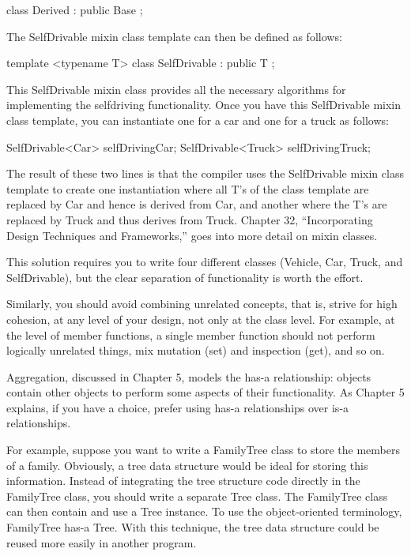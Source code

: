 \begin{cpp}
class Derived : public Base {};
\end{cpp}

The SelfDrivable mixin class template can then be defined as follows:

\begin{cpp}
template <typename T>
class SelfDrivable : public T
{
};
\end{cpp}

This SelfDrivable mixin class provides all the necessary algorithms for implementing the selfdriving functionality. Once you have this SelfDrivable mixin class template, you can instantiate one for a car and one for a truck as follows:

\begin{cpp}
SelfDrivable<Car> selfDrivingCar;
SelfDrivable<Truck> selfDrivingTruck;
\end{cpp}

The result of these two lines is that the compiler uses the SelfDrivable mixin class template to create one instantiation where all T’s of the class template are replaced by Car and hence is derived from Car, and another where the T’s are replaced by Truck and thus derives from Truck. Chapter 32, “Incorporating Design Techniques and Frameworks,” goes into more detail on mixin classes.

This solution requires you to write four different classes (Vehicle, Car, Truck, and SelfDrivable), but the clear separation of functionality is worth the effort.

Similarly, you should avoid combining unrelated concepts, that is, strive for high cohesion, at any level of your design, not only at the class level. For example, at the level of member functions, a single member function should not perform logically unrelated things, mix mutation (set) and inspection (get), and so on.


Aggregation, discussed in Chapter 5, models the has-a relationship: objects contain other objects to perform some aspects of their functionality. As Chapter 5 explains, if you have a choice, prefer using has-a relationships over is-a relationships.

For example, suppose you want to write a FamilyTree class to store the members of a family. Obviously, a tree data structure would be ideal for storing this information. Instead of integrating the tree structure code directly in the FamilyTree class, you should write a separate Tree class. The FamilyTree class can then contain and use a Tree instance. To use the object-oriented terminology, FamilyTree has-a Tree. With this technique, the tree data structure could be reused more easily in another program.

